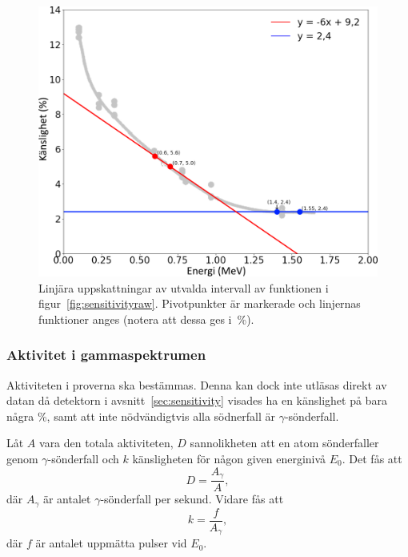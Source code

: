 \begin{figure}[!hp]
    \centering
    \includegraphics[width=\textwidth, keepaspectratio]{../images/sensitivity.png}
    \caption{
        Linjära uppskattningar av utvalda intervall av funktionen i
        figur~\ref{fig:sensitivityraw}. Pivotpunkter är markerade och linjernas
        funktioner anges (notera att dessa ges i~\unit{\percent}).
    }
    \label{fig:sensitivity}
\end{figure}

\subsubsection{Aktivitet i gammaspektrumen} \label{sec:activity}

Aktiviteten i proverna ska bestämmas. Denna kan dock inte utläsas direkt av
datan då detektorn i avsnitt~\ref{sec:sensitivity} visades ha en känslighet
på bara några \unit{\percent}, samt att inte nödvändigtvis alla södnerfall är
$\gamma$-sönderfall.

Låt $A$ vara den totala aktiviteten, $D$ sannolikheten att en atom
sönderfaller genom $\gamma$-sönderfall och $k$ känsligheten för någon given
energinivå $E_0$. Det fås att
%
\begin{equation}
    D = \frac{A_\gamma}{A} \label{eq:sharegamma},
\end{equation}
%
där $A_\gamma$ är antalet $\gamma$-sönderfall per sekund. Vidare fås att
%
\begin{equation}
    k = \frac{f}{A_\gamma} \label{eq:sensitivity},
\end{equation}
%
där $f$ är antalet uppmätta pulser vid $E_0$.


